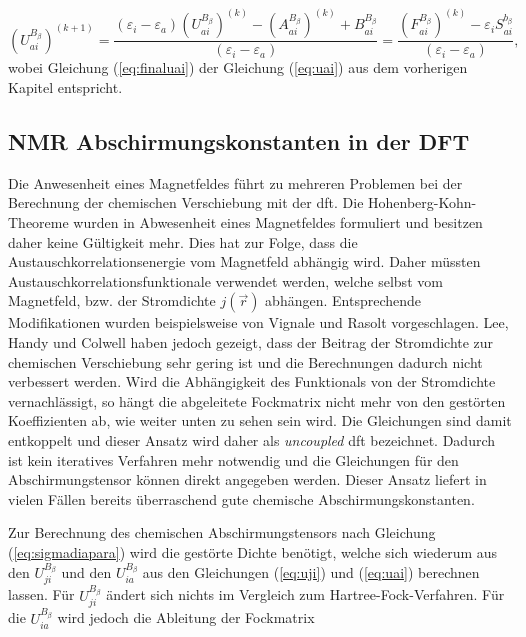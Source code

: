      \begin{equation}\label{eq:finaluai}
     \left(U_{ai}^{B_\beta}\right)^{(k+1)}=\frac{\left(\varepsilon_i-\varepsilon_a\right)\left(U_{ai}^{B_\beta}\right)^{(k)}-\left(A_{ai}^{B_\beta}\right)^{(k)}+B_{ai}^{B_\beta}}{\left(\varepsilon_i-\varepsilon_a\right)}=\frac{\left(F_{ai}^{B_\beta}\right)^{(k)}-\varepsilon_i S_{ai}^{b_\beta}}{\left(\varepsilon_i-\varepsilon_a\right)},
     \end{equation}
     wobei Gleichung (\ref{eq:finaluai}) der Gleichung (\ref{eq:uai}) aus dem vorherigen Kapitel entspricht.

\subsection{NMR Abschirmungskonstanten in der DFT}    
	Die Anwesenheit eines Magnetfeldes führt zu mehreren Problemen bei der Berechnung der chemischen Verschiebung mit der \ac{dft}. Die Hohenberg-Kohn-Theoreme wurden in Abwesenheit eines Magnetfeldes formuliert und besitzen daher keine Gültigkeit mehr.\supercite{rajagopal1973inhomogeneous,vignale1988current} Dies hat zur Folge, dass die Austauschkorrelationsenergie vom Magnetfeld abhängig wird.\supercite{buhl1999dft} Daher müssten Austauschkorrelationsfunktionale verwendet werden, welche selbst vom Magnetfeld, bzw. der Stromdichte $j(\vec{r})$ abhängen. Entsprechende Modifikationen wurden beispielsweise von Vignale und Rasolt vorgeschlagen.\supercite{vignale1988current,vignale1987density} Lee, Handy und Colwell \supercite{lee1995density} haben jedoch gezeigt, dass der Beitrag der Stromdichte zur chemischen Verschiebung sehr gering ist und die Berechnungen dadurch nicht verbessert werden. Wird die Abhängigkeit des Funktionals von der Stromdichte vernachlässigt, so hängt die abgeleitete Fockmatrix nicht mehr von den gestörten Koeffizienten ab, wie weiter unten zu sehen sein wird. Die Gleichungen sind damit entkoppelt und dieser Ansatz wird daher als \textit{uncoupled} \ac{dft} bezeichnet.\supercite{bieger1985lcao,malkin1993calculations} Dadurch ist kein iteratives Verfahren mehr notwendig und die Gleichungen für den Abschirmungstensor können direkt angegeben werden.  Dieser Ansatz liefert in vielen Fällen bereits überraschend gute chemische Abschirmungskonstanten.\supercite{buhl1999dft}
	
\bigskip
Zur Berechnung des chemischen Abschirmungstensors nach Gleichung (\ref{eq:sigmadiapara}) wird die gestörte Dichte benötigt, welche sich wiederum aus den $U_{ji}^{B_\beta}$ und den $U_{ia}^{B_\beta}$ aus den Gleichungen (\ref{eq:uji}) und (\ref{eq:uai}) berechnen lassen. Für $U_{ji}^{B_\beta}$ ändert sich nichts im Vergleich zum Hartree-Fock-Verfahren. Für die $U_{ia}^{B_\beta}$ wird jedoch die Ableitung der Fockmatrix 

